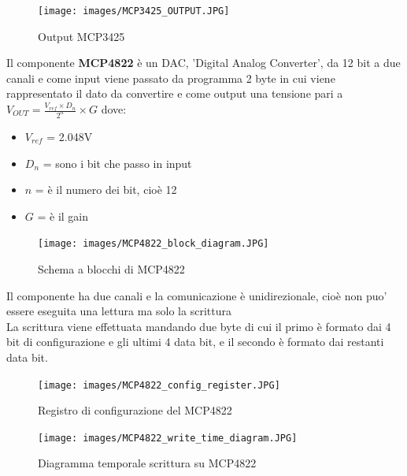 \documentclass[12pt, a4paper, titlepage, oneside]{book}
\begin{document}
\begin{flushleft}
\begin{figure}[h]
    \centering
    \texttt{[image: images/MCP3425\_OUTPUT.JPG]}
    \caption{Output MCP3425}
    \label{fig:MCP3425_wrtie_conf}
\end{figure}

\newpage
Il componente \textbf{MCP4822} è un DAC, 'Digital Analog Converter', da 12 bit a due canali e come input viene passato da programma 2 byte in cui viene rappresentato il dato da convertire e come output una tensione pari a $V_{OUT} = \frac{V_{ref} \times D_n}{2^n} \times G$ dove:
\begin{itemize}
    \item $V_{ref}$ = 2.048V
    \item $D_n$ = sono i bit che passo in input
    \item $n$ = è il numero dei bit, cioè 12
    \item $G$ = è il gain
\end{itemize}


\begin{figure} [h]
    \centering
    \texttt{[image: images/MCP4822\_block\_diagram.JPG]}
    \caption{Schema a blocchi di MCP4822}
    \label{fig: MCP4822 BLOCK DIAGRAM}
\end{figure}

Il componente ha due canali e la comunicazione è unidirezionale, cioè non puo' essere eseguita una lettura ma solo la scrittura \\
\newpage
La scrittura viene effettuata mandando due byte di cui il primo è formato dai 4 bit di configurazione e gli ultimi 4 data bit, e il secondo è formato dai restanti data bit.\\
\begin{figure}[h]
    \centering
    \texttt{[image: images/MCP4822\_config\_register.JPG]}
    \caption{Registro di configurazione del MCP4822}
    \label{fig:MCP4822_CONF_REGISTER}
\end{figure}
\begin{figure}[h]
    \centering
    \texttt{[image: images/MCP4822\_write\_time\_diagram.JPG]}
    \caption{Diagramma temporale scrittura su MCP4822}
    \label{fig:MCP4822 TIME DIAGRAM}
\end{figure}


\end{flushleft}
\end{document}
